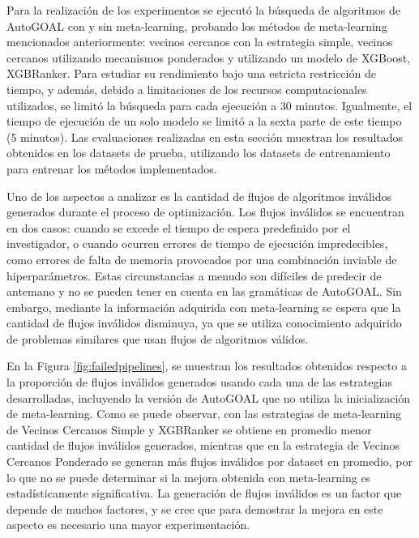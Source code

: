 Para la realización de los experimentos se ejecutó la búsqueda de algoritmos de AutoGOAL con y sin meta-learning, probando los métodos de meta-learning mencionados anteriormente: vecinos cercanos con la estrategia simple, vecinos cercanos utilizando mecanismos ponderados y utilizando un modelo de XGBoost, XGBRanker. Para estudiar su rendimiento bajo una estricta restricción de tiempo, y además, debido a limitaciones de los recursos computacionales utilizados, se limitó la búsqueda para cada ejecución a 30 minutos. Igualmente, el tiempo de ejecución de un solo modelo se limitó a la sexta parte de este tiempo (5 minutos). Las evaluaciones realizadas en esta sección muestran los resultados obtenidos en los datasets de prueba, utilizando los datasets de entrenamiento para entrenar los métodos implementados. %

Uno de los aspectos a analizar es la cantidad de flujos de algoritmos inválidos generados durante el proceso de optimización. Los flujos inválidos se encuentran en dos casos: cuando se excede el tiempo de espera predefinido por el investigador, o cuando ocurren errores de tiempo de ejecución impredecibles, como errores de falta de memoria provocados por una combinación inviable de hiperparámetros. Estas circunstancias a menudo son difíciles de predecir de antemano y no se pueden tener en cuenta en las gramáticas de AutoGOAL. Sin embargo, mediante la información adquirida con meta-learning se espera que la cantidad de flujos inválidos disminuya, ya que se utiliza conocimiento adquirido de problemas similares que usan flujos de algoritmos válidos.

En la Figura \ref{fig:failedpipelines}, se muestran los resultados obtenidos respecto a la proporción de flujos inválidos generados usando cada una de las estrategias desarrolladas, incluyendo la versión de AutoGOAL que no utiliza la inicialización de meta-learning. Como se puede observar, con las estrategias de meta-learning de Vecinos Cercanos Simple y XGBRanker se obtiene en promedio menor cantidad de flujos inválidos generados, mientras que en la estrategia de Vecinos Cercanos Ponderado se generan más flujos inválidos por dataset en promedio, por lo que no se puede determinar si la mejora obtenida con meta-learning es estadísticamente significativa. La generación de flujos inválidos es un factor que depende de muchos factores, y se cree que para demostrar la mejora en este aspecto es necesario una mayor experimentación.


